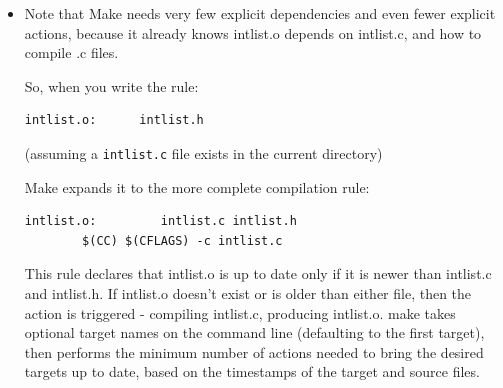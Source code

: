 \documentclass[aspectratio=169]{beamer}
\begin{document}
\begin{frame}[fragile]

\begin{itemize}
      \item
	Note that Make needs very few explicit dependencies and even fewer explicit actions,
	because it already knows \alert{intlist.o} depends on \alert{intlist.c},
	and how to compile \alert{.c} files. %

      \pitem
      So, when you write the rule:
\begin{verbatim}
intlist.o:      intlist.h
\end{verbatim}

      (assuming a \verb+intlist.c+ file exists in the current directory)

      \pause
      Make expands it to the more complete compilation rule:

\begin{verbatim}
intlist.o:         intlist.c intlist.h
        $(CC) $(CFLAGS) -c intlist.c
\end{verbatim}

      \pitem
	This rule declares that \alert{intlist.o} is up
	to date only if it is \alert{newer than intlist.c and intlist.h}.
	If \alert{intlist.o doesn't exist} or \alert{is older than either file},
	then the action is triggered - compiling \alert{intlist.c}, producing \alert{intlist.o}.
      \pitem
        \alert{make} takes optional target names on the command line
	(defaulting to the first target),
        then performs the \alert{minimum number of actions}
	needed to bring the desired targets \alert{up to date},
	based on the \alert{timestamps} of the target and source files.
	
%

\end{itemize}

\end{frame}
\end{document}
